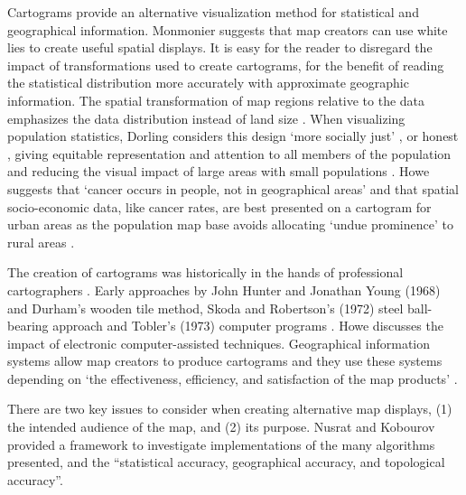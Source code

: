 \documentclass{monashthesis}
\begin{document}
Cartograms provide an alternative visualization method for statistical and geographical information. Monmonier \autocite{HTLWM} suggests that map creators can use white lies to create useful spatial displays. It is easy for the reader to disregard the impact of transformations used to create cartograms, for the benefit of reading the statistical distribution more accurately with approximate geographic information. The spatial transformation of map regions relative to the data emphasizes the data distribution instead of land size \autocite{CBATCC}. When visualizing population statistics, Dorling considers this design `more socially just' \autocite{ACTUC}, or honest \autocite{NISCC}, giving equitable representation and attention to all members of the population and reducing the visual impact of large areas with small populations \autocite{DMAHP}. Howe \autocite{HEDP} suggests that `cancer occurs in people, not in geographical areas' and that spatial socio-economic data, like cancer rates, are best presented on a cartogram for urban areas as the population map base avoids allocating `undue prominence' to rural areas \autocite{CTTMB}.

The creation of cartograms was historically in the hands of professional cartographers \autocite{CD}. Early approaches by John Hunter and Jonathan Young (1968) and Durham's wooden tile method, Skoda and Robertson's (1972) steel ball-bearing approach and Tobler's (1973) computer programs \autocite{ACTUC}. Howe \autocite{HEDP} discusses the impact of electronic computer-assisted techniques. Geographical information systems allow map creators to produce cartograms and they use these systems depending on `the effectiveness, efficiency, and satisfaction of the map products' \autocite{CD}.

There are two key issues to consider when creating alternative map displays, (1) the intended audience of the map, and (2) its purpose. Nusrat and Kobourov \autocite{SAIC} provided a framework to investigate implementations of the many algorithms presented, and the ``statistical accuracy, geographical accuracy, and topological accuracy''.

\begin{Shaded}
\begin{Highlighting}[]
\OperatorTok{::}\NormalTok{(}\NormalTok{)}
\end{Highlighting}
\end{Shaded}
\end{document}
